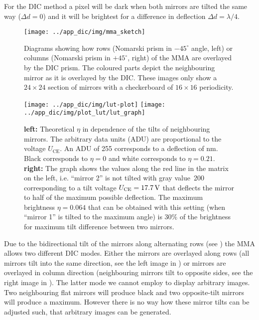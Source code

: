 For the DIC method a pixel will be dark when both mirrors are tilted
the same way ($\Delta d=0$) and it will be brightest for a difference
in deflection $\Delta d=\lambda/4$.
\begin{figure}[ht]
  \centering
  \texttt{[image: ../app\_dic/img/mma\_sketch]}
  \caption{ Diagrams showing how rows (Nomarski prism in $-45^\circ$
    angle, left) or columns (Nomarski prism in $+45^\circ$, right) of
    the MMA are overlayed by the DIC prism. The coloured parts depict
    the neighbouring mirror as it is overlayed by the DIC. These
    images only show a $24\times 24$ section of mirrors with a
    checkerboard of $16\times 16$ periodicity.}
  \label{fig:screen}
\end{figure}
\begin{figure}[htb]
  \centering
  \texttt{[image: ../app\_dic/img/lut-plot]}
  \texttt{[image: ../app\_dic/img/plot\_lut/lut\_graph]}

  \caption{{\bf left:} Theoretical $\eta$ in dependence of the tilts
    of neighbouring mirrors. The arbitrary data units (ADU) are
    proportional to the voltage $U_\textrm{CE}$. An ADU of 255
    corresponds to a deflection of \unit[134]{nm}. Black corresponds
    to $\eta=0$ and white corresponds to $\eta=0.21$. {\bf right:} The
    graph shows the values along the red line in the matrix on the
    left, i.e. ``mirror 2'' is not tilted with gray value~200
    corresponding to a tilt voltage $U_\textrm{CE}=\unit[17.7]{V}$
    that deflects the mirror to half of the maximum possible
    deflection. The maximum brightness $\eta=0.064$ that can be
    obtained with this setting (when ``mirror 1'' is tilted to the
    maximum angle) is $30\%$ of the brightness for maximum tilt
    difference between two mirrors.}
  \label{fig:deflection2}
\end{figure}
Due to the bidirectional tilt of the mirrors along alternating rows
(see ) the MMA allows two different DIC modes.
Either the mirrors are overlayed along rows (all mirrors tilt into the
same direction, see the left image in ) or mirrors
are overlayed in column direction (neighbouring mirrors tilt to
opposite sides, see the right image in ). The
latter mode we cannot employ to display arbitrary images.  Two
neighbouring flat mirrors will produce black and two opposite-tilt
mirrors will produce a maximum. However there is no way how these
mirror tilts can be adjusted such, that arbitrary images can be
generated.

